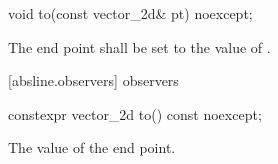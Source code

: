 \begin{itemdecl}
void to(const vector_2d& pt) noexcept;
\end{itemdecl}
\begin{itemdescr}
\pnum
\effects
The end point shall be set to the value of .
\end{itemdescr}

 [absline.observers]{ observers}

\begin{itemdecl}
constexpr vector_2d to() const noexcept;
\end{itemdecl}
\begin{itemdescr}
\pnum
\returns
The value of the end point.
\end{itemdescr}
